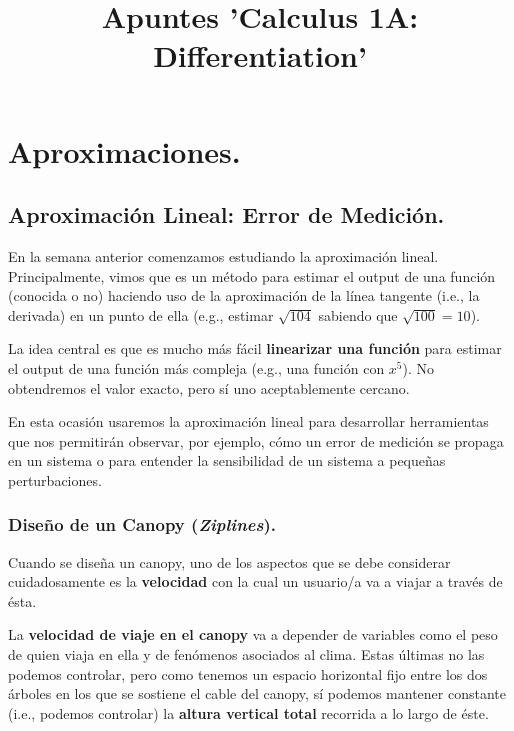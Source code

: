 \documentclass[12pt]{article}
\title{Apuntes 'Calculus 1A: Differentiation'}
\author{}
\date{}
\begin{document}
\maketitle
\tableofcontents

\newpage



\section{Aproximaciones.}


\subsection{Aproximación Lineal: Error de Medición.}

En la semana anterior comenzamos estudiando la aproximación lineal.
Principalmente, vimos que es un método para estimar el output de una función (conocida o no) haciendo uso de la aproximación de la línea tangente (i.e., la derivada) en un punto de ella (e.g., estimar $\sqrt{104}$ sabiendo que $\sqrt{100} = 10$).

La idea central es que es mucho más fácil \textbf{linearizar una función} para estimar el output de una función más compleja (e.g., una función con $x^{5}$). No obtendremos el valor exacto, pero sí uno aceptablemente cercano.

En esta ocasión usaremos la aproximación lineal para desarrollar herramientas que nos permitirán observar, por ejemplo, cómo un error de medición se propaga en un sistema o para entender la sensibilidad de un sistema a pequeñas perturbaciones.

\subsubsection{Diseño de un Canopy (\textit{Ziplines}).}

Cuando se diseña un canopy, uno de los aspectos que se debe considerar cuidadosamente es la \textbf{velocidad} con la cual un usuario/a va a viajar a través de ésta.

La \textbf{velocidad de viaje en el canopy} va a depender de variables como el peso de quien viaja en ella y de fenómenos asociados al clima. Estas últimas no las podemos controlar, pero como tenemos un espacio horizontal fijo entre los dos árboles en los que se sostiene el cable del canopy, sí podemos mantener constante (i.e., podemos controlar) la \textbf{altura vertical total} recorrida a lo largo de éste.
\end{document}
